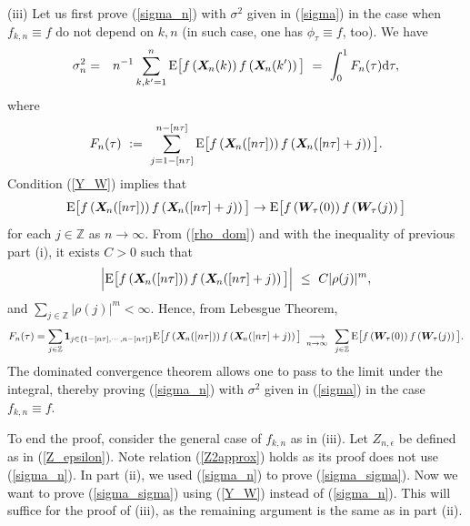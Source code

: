 \documentclass[10pt]{article}
\def\Z{\mathbb{Z}}
\def\d{\mathrm d}
\def\E{\mathrm E}
\def\1{{\bf 1}}
\newcommand{\mbf}[1]{\mbox{\boldmath $#1$}}
\def\limiten{\renewcommand{\arraystretch}{0.5}
\begin{array}[t]{c}
\stackrel{}{\longrightarrow} \\
{\scriptstyle n\rightarrow\infty}
\end{array}\renewcommand{\arraystretch}{1}}
\begin{document}
\noindent (iii) Let us first prove (\ref{sigma_n}) with $\sigma^2
$ given in (\ref{sigma}) in the case when $f_{k,n} \equiv f$ do
not depend on $k, n$ (in such case, one has $\phi_\tau \equiv f $,
too). We have
\begin{eqnarray}
\sigma^2_n &=&n^{-1}\sum_{k,k'=1}^n \E \big[f\left({\mbf X}_{\!
n}(k)\right) f\left({\mbf X}_{\! n}(k')\right)\big] \ =  \  \int_0^1
F_n(\tau) \d \tau, \label{int_F}
\end{eqnarray}
where
\begin{equation}
F_n(\tau) \ := \  \sum_{j=1- [n\tau]}^{n - [n\tau]} \E \big[
f\left({\mbf X}_{\! n}([n\tau])\right) f\left({\mbf X}_{\!
n}([n\tau] + j)\right)\big].  \label{F_n}
\end{equation}
Condition (\ref{Y_W}) implies that
$$
\E \big[f\left({\mbf X}_{\! n}([n\tau])\right) f\left({\mbf X}_{\!
n}([n\tau] + j)\right)\big] \rightarrow \E \big[f\left({\mbf W}_{\!
\tau}(0)\right) f\left({\mbf W}_{\! \tau}(j)\right)\big] $$ for each
$j\in {\Z}$ as $n \to \infty $. From (\ref{rho_dom}) and with the
inequality of previous part (i), it exists $C>0$ such that
\begin{equation}
\Big|\E \big[ f\left({\mbf X}_{\! n}([n\tau])\right) f\left({\mbf X}_{\!
n}([n\tau] + j)\right) \big] \Big |\ \leq \  C |\rho(j)|^m, \label{arcones}
\end{equation}
and $\sum_{j\in {\Z}} |\rho(j)|^m < \infty $. Hence, from Lebesgue
Theorem,
$$
F_n(\tau)=\sum_{j \in \Z} \1_{j \in \{ 1- [n\tau],\cdots,n -
[n\tau]\}}\E \big[f\left({\mbf X}_{\! n}([n\tau])\right) f\left({\mbf
X}_{\! n}([n\tau] + j)\right)\big]  \limiten  \sum_{j \in \Z}\E
\big[f\left({\mbf W}_{\! \tau}(0)\right) f\left({\mbf W}_{\!
\tau}(j)\right)\big].
$$
The dominated convergence theorem allows one to  pass to the limit
under the integral, thereby proving (\ref{sigma_n}) with $\sigma^2$
given in (\ref{sigma}) in the case $f_{k,n} \equiv f$.

\smallskip

To end the proof, consider the general case of $f_{k,n}$ as in
(iii). Let $Z_{n,\epsilon}$ be defined as in (\ref{Z_epsilon}). Note
relation (\ref{Z2approx}) holds as its proof does not use
(\ref{sigma_n}). In part (ii), we used  (\ref{sigma_n}) to prove
(\ref{sigma_sigma}). Now we want to prove  (\ref{sigma_sigma}) using
(\ref{Y_W}) instead of (\ref{sigma_n}). This will suffice for the
proof of (iii), as the remaining argument is the same as in part
(ii).
\end{document}
